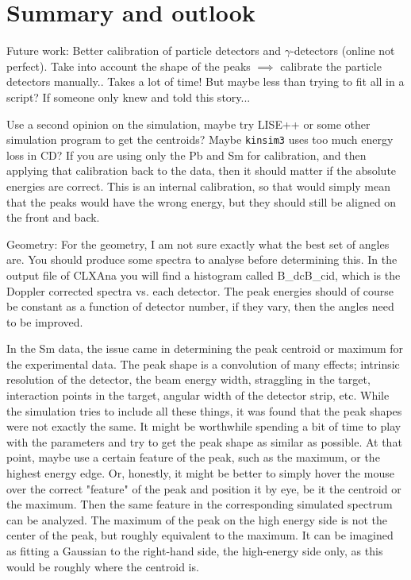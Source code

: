 \documentclass[twoside,english]{uiofysmaster/uiofysmaster}
\newcommand{\ga}{$\gamma$}
\begin{document}
\chapter{Summary and outlook}

Future work: Better calibration of particle detectors and \ga-detectors (online not perfect). Take into account the shape of the peaks $\implies$ calibrate the particle detectors manually.. Takes a lot of time! But maybe less than trying to fit all in a script? If someone only knew and told this story...

Use a second opinion on the simulation, maybe try LISE++ or some other simulation program to get the centroids?
Maybe \texttt{kinsim3} uses too much energy loss in CD? 
If you are using only the Pb and Sm for calibration, and then applying that calibration back to the data, then it should matter if the absolute energies are correct. 
This is an internal calibration, so that would simply mean that the peaks would have the wrong energy, but they should still be aligned on the front and back.


\bigskip

Geometry:
For the geometry, I am not sure exactly what the best set of angles are. You should produce some spectra to analyse before determining this. In the output file of CLXAna you will find a histogram called B\_dcB\_cid, which is the Doppler corrected spectra vs. each detector. The peak energies should of course be constant as a function of detector number, if they vary, then the angles need to be improved.


\bigskip


In the Sm data, the issue came in determining the peak centroid or maximum for the experimental data. 
The peak shape is a convolution of many effects; intrinsic resolution of the detector, the beam energy width, straggling in the target, interaction points in the target, angular width of the detector strip, etc. 
While the simulation tries to include all these things, it was found that the peak shapes were not exactly the same. 
It might be worthwhile spending a bit of time to play with the parameters and try to get the peak shape as similar as possible. 
At that point, maybe use a certain feature of the peak, such as the maximum, or the highest energy edge. 
Or, honestly, it might be better to simply hover the mouse over the correct "feature" of the peak and position it by eye, be it the centroid or the maximum.
Then the same feature in the corresponding simulated spectrum can be analyzed.
The maximum of the peak on the high energy side is not the center of the peak, but roughly equivalent to the maximum. 
It can be imagined as fitting a Gaussian to the right-hand side, the high-energy side only, as this would be roughly where the centroid is. 
\end{document}
